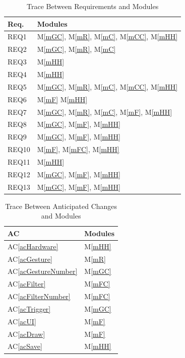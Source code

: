 \documentclass[12pt, titlepage]{article}
\newcommand{\acref}[1]{AC\ref{#1}}
\newcommand{\mref}[1]{M\ref{#1}}
\begin{document}
\begin{table}[H]
\centering
\begin{tabular}{p{} p{}}
\toprule
\textbf{Req.} & \textbf{Modules}\\
\midrule
REQ1 & \mref{mGC}, \mref{mR}, \mref{mC}, \mref{mCC}, \mref{mHH}\\
REQ2 & \mref{mGC}, \mref{mR}, \mref{mC}\\
REQ3 & \mref{mHH}\\
REQ4 & \mref{mHH}\\
REQ5 & \mref{mGC}, \mref{mR}, \mref{mC}, \mref{mCC}, \mref{mHH}\\
REQ6 & \mref{mF} \mref{mHH}\\
REQ7 & \mref{mGC}, \mref{mR}, \mref{mC},  \mref{mF}, \mref{mHH}\\
REQ8 & \mref{mGC}, \mref{mF}, \mref{mHH}\\
REQ9 & \mref{mGC}, \mref{mF}, \mref{mHH}\\
REQ10 & \mref{mF}, \mref{mFC}, \mref{mHH}\\
REQ11 & \mref{mHH}\\
REQ12 & \mref{mGC}, \mref{mF}, \mref{mHH}\\
REQ13 & \mref{mGC}, \mref{mF}, \mref{mHH}\\
\bottomrule
\end{tabular}
\caption{Trace Between Requirements and Modules}
\label{TblRT}
\end{table}

\begin{table}[H]
\centering
\begin{tabular}{p{} p{}}
\toprule
\textbf{AC} & \textbf{Modules}\\
\midrule
\acref{acHardware} & \mref{mHH}\\
\acref{acGesture} & \mref{mR} \\
\acref{acGestureNumber} & \mref{mGC}\\
\acref{acFilter} & \mref{mFC}\\
\acref{acFilterNumber} & \mref{mFC}\\
\acref{acTrigger} & \mref{mGC} \\
\acref{acUI} & \mref{mF} \\
\acref{acDraw} & \mref{mF} \\
\acref{acSave} & \mref{mHH} \\
\bottomrule
\end{tabular}
\caption{Trace Between Anticipated Changes and Modules}
\label{TblACT}
\end{table}
\end{document}
